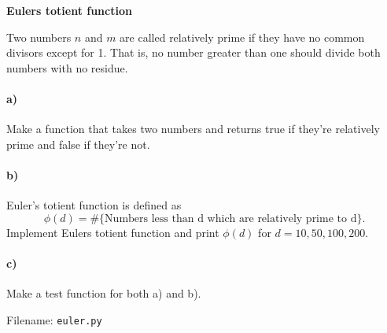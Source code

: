 \begin{Problem}{\textbf{Eulers totient function}}

\noindent Two numbers $n$ and $m$ are called relatively prime if they have no common divisors
except for 1. That is, no number greater than one should divide both numbers with
no residue.

\paragraph{a)}
Make a function that takes two numbers and returns true if they're relatively prime
and false if they're not.

\paragraph{b)}
Euler's totient function is defined as 
\begin{equation*}
\phi(d)= \text{\#\{Numbers less than d which are
relatively prime to d\}.}
\end{equation*}
Implement Eulers totient function and print $\phi(d)$ for $d=10,50,100,200$.

\paragraph{c)}
Make a test function for both a) and b).

Filename: \texttt{euler.py} 
\end{Problem}

